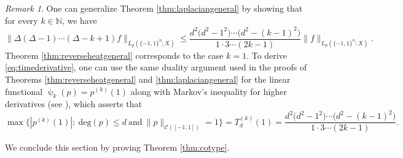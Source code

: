 \documentclass[11pt,reqno]{amsart}
\renewcommand{\leq}{\leqslant}
\newcommand{\1}{\mathbf 1}
\theoremstyle{remark}
\newtheorem{remark}[theorem]{Remark}
\newcommand{\N}{\mathbb N}
\renewcommand{\psi}{\uppsi}
\newcommand{\ms}{\mathscr}
\begin{document}
\medskip

\begin{remark} \label{rem:timederivative}
One can generalize Theorem \ref{thm:laplaciangeneral} by showing that for every $k\in\N$, we have
\begin{equation} \label{eq:timederivative}
\|\Delta(\Delta-1)\cdots(\Delta-k+1) f\|_{L_p(\{-1,1\}^n;X)} \leq \frac{d^2\big(d^2-1^2\big)\cdots\big(d^2-(k-1)^2\big)}{1\cdot 3\cdots (2k-1)} \|f\|_{L_p(\{-1,1\}^n;X)}.
\end{equation}
Theorem \ref{thm:reverseheatgeneral} corresponds to the case $k=1$. To derive \eqref{eq:timederivative}, one can use the same duality argument used in the proofs of Theorems \ref{thm:reverseheatgeneral} and \ref{thm:laplaciangeneral} for the linear functional $\psi_k(p) = p^{(k)}(1)$ along with Markov's inequality for higher derivatives (see \cite[Theorem~5.2.1]{BE95}), which asserts that
\begin{equation} \label{eq:vamarkov}
\max \{ |p^{(k)}(1)|: \ \mathrm{deg}(p)\leq d \ \mbox{and} \ \|p\|_{\ms{C}([-1,1])}=1\big\} = T_d^{(k)}(1) = \frac{d^2\big(d^2-1^2\big)\cdots\big(d^2-(k-1)^2\big)}{1\cdot 3\cdots (2k-1)}.
\end{equation}
\end{remark}

We conclude this section by proving Theorem \ref{thm:cotype}.

\medskip
\end{document}
